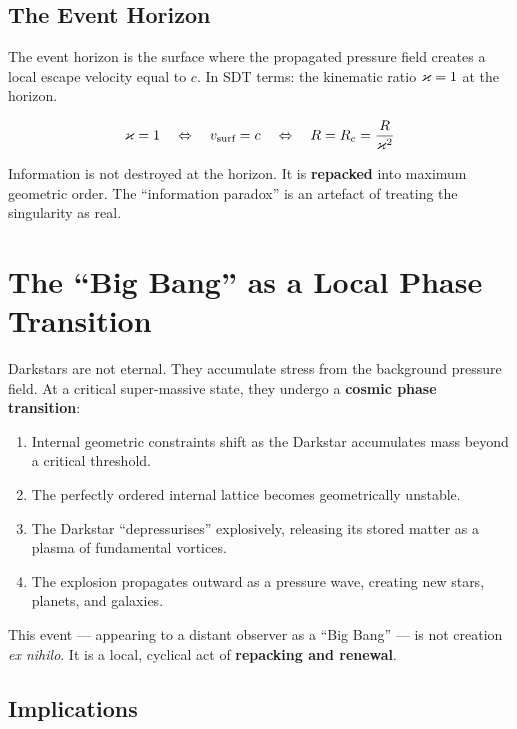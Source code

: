 \subsection{The Event Horizon}

The event horizon is the surface where the propagated pressure field creates a local escape velocity equal to $c$.  In SDT terms: the kinematic ratio $\varkappa = 1$ at the horizon.

\begin{equation}
  \varkappa = 1 \quad \Leftrightarrow \quad v_{\text{surf}} = c \quad \Leftrightarrow \quad R = R_c = \frac{R}{\varkappa^2}
\end{equation}

Information is not destroyed at the horizon.  It is \textbf{repacked} into maximum geometric order.  The ``information paradox'' is an artefact of treating the singularity as real.


\section{The ``Big Bang'' as a Local Phase Transition}

Darkstars are not eternal.  They accumulate stress from the background pressure field.  At a critical super-massive state, they undergo a \textbf{cosmic phase transition}:

\begin{enumerate}
  \item Internal geometric constraints shift as the Darkstar accumulates mass beyond a critical threshold.
  \item The perfectly ordered internal lattice becomes geometrically unstable.
  \item The Darkstar ``depressurises'' explosively, releasing its stored matter as a plasma of fundamental vortices.
  \item The explosion propagates outward as a pressure wave, creating new stars, planets, and galaxies.
\end{enumerate}

This event --- appearing to a distant observer as a ``Big Bang'' --- is not creation \emph{ex nihilo}.  It is a local, cyclical act of \textbf{repacking and renewal}.

\subsection{Implications}

